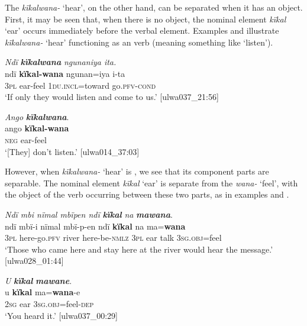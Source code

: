 The  \textit{kïkalwana-} ‘hear’, on the other hand, can be separated when it has an object. First, it may be seen that, when there is no object, the nominal element \textit{kïkal} ‘ear’ occurs immediately before the verbal element. Examples  and  illustrate \textit{kïkalwana-} ‘hear’ functioning as an  verb (meaning something like ‘listen’).

\ea%
    \label{ex:phrase:52}
          \textit{Ndï} \textbf{\textit{kïkalwana}} \textit{ngunaniya ita.}\\
\gll    ndï  \textbf{kïkal-wana}  ngunan=iya    i-ta\\
    3\textsc{pl}  ear-feel    1\textsc{du.incl}=toward  go.\textsc{pfv-cond}\\
\glt `If only they would listen and come to us.’ [ulwa037\_21:56]
\z

\ea%
    \label{ex:phrase:53}
          \textit{Ango} \textbf{\textit{kïkalwana}}.\\
\gll ango  \textbf{kïkal-wana}\\
    \textsc{neg}  ear-feel\\
\glt `[They] don’t listen.’ [ulwa014\_37:03]
\z

However, when \textit{kïkalwana-} ‘hear’ is , we see that its component parts are separable. The nominal element \textit{kïkal} ‘ear’ is separate from the  \textit{wana-} ‘feel’, with the object of the verb occurring between these two parts, as in examples  and .

\ea%
    \label{ex:phrase:54}
          \textit{Ndï mbi nïmal mbïpen ndï} \textbf{\textit{kïkal}} \textit{na} \textbf{\textit{mawana}}.\\
\gll ndï  mbï-i      nïmal  mbï-p-en    ndï  \textbf{kïkal}  na ma=\textbf{wana}\\
    3\textsc{pl}  here-go.\textsc{pfv}  river  here-be\textsc{{}-nmlz}  \textsc{3pl}  ear    talk    3\textsc{sg.obj}=feel\\
\glt `Those who came here and stay here at the river would hear the message.’ [ulwa028\_01:44]
\z

\ea%
    \label{ex:phrase:56}
          \textit{U} \textbf{\textit{kïkal}} \textbf{\textit{mawane}}.\\
\gll u    \textbf{kïkal}  ma=\textbf{wana}{}-e\\
    2\textsc{sg}  ear    3\textsc{sg.obj}=feel-\textsc{dep}\\
\glt `You heard it.’ [ulwa037\_00:29]
\z

